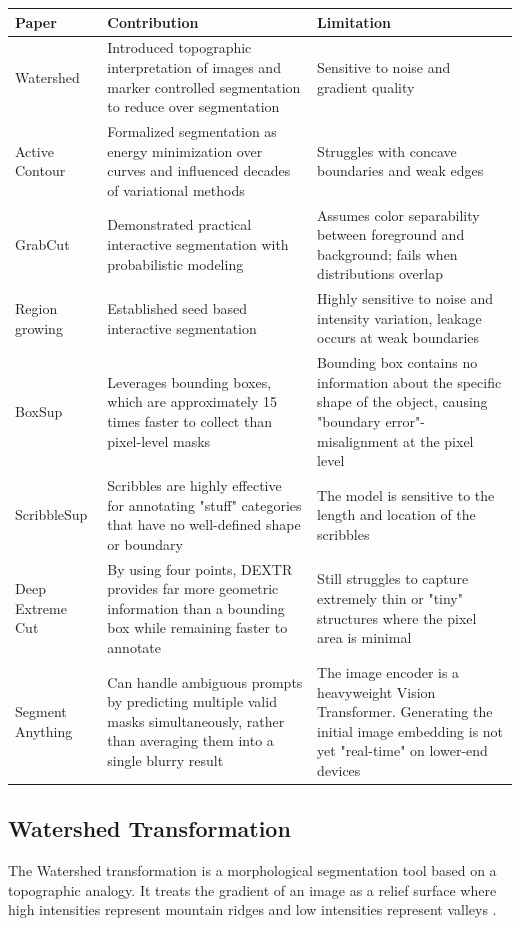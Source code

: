\begin{table}[H]
	\centering
	\begin{tabular}{|p{3cm}|p{6cm}|p{6cm}|}
		\hline
		\textbf{Paper} & \textbf{Contribution} & \textbf{Limitation} \\ \hline
		Watershed &
		Introduced topographic interpretation of images and marker controlled segmentation to reduce over segmentation &
		Sensitive to noise and gradient quality \\ \hline
		Active Contour &
		Formalized segmentation as energy minimization over curves and influenced decades of variational methods &
		Struggles with concave boundaries and weak edges \\ \hline
		GrabCut &
		Demonstrated practical interactive segmentation with probabilistic modeling &
		Assumes color separability between foreground and background; fails when distributions overlap \\ \hline
		Region growing &
		Established seed based interactive segmentation &
		Highly sensitive to noise and intensity variation, leakage occurs at weak boundaries \\ \hline
		BoxSup & Leverages bounding boxes, which are approximately 15 times faster to collect than pixel-level masks & Bounding box contains no information about the specific shape of the object, causing "boundary error"-misalignment at the pixel level \\ \hline
		ScribbleSup & Scribbles are highly effective for annotating "stuff" categories that have no well-defined shape or boundary & The model is sensitive to the length and location of the scribbles \\ \hline
		Deep Extreme Cut & By using four points, DEXTR provides far more geometric information than a bounding box while remaining faster to annotate & Still struggles to capture extremely thin or "tiny" structures where the pixel area is minimal \\ \hline
		Segment Anything & Can handle ambiguous prompts by predicting multiple valid masks simultaneously, rather than averaging them into a single blurry result & The image encoder is a heavyweight Vision Transformer. Generating the initial image embedding is not yet "real-time" on lower-end devices \\ \hline
	\end{tabular}
\end{table}

\subsection{Watershed Transformation}
The Watershed transformation is a morphological segmentation tool based on a topographic analogy. It treats the gradient of an image as a relief surface where high intensities represent mountain ridges and low intensities represent valleys \cite{watershed_1979}.

